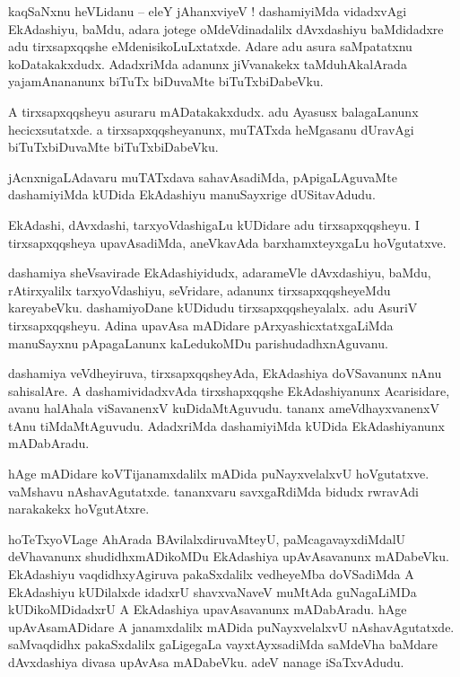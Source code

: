 \documentclass{article}
\begin{document}
\begin{mn}%
kaqSaNxnu heVLidanu -- eleY jAhanxviyeV ! dashamiyiMda vidadxvAgi EkAdashiyu, baMdu, adara jotege 
oMdeVdinadalilx dAvxdashiyu baMdidadxre adu tirxsapxqqshe eMdenisikoLuLxtatxde. Adare adu asura 
saMpatatxnu koDatakakxdudx. AdadxriMda adanunx jiVvanakekx taMduhAkalArada yajamAnananunx biTuTx 
biDuvaMte biTuTxbiDabeVku.
\end{mn}

\begin{mn}%
A tirxsapxqqsheyu asuraru mADatakakxdudx. adu Ayasusx balagaLanunx hecicxsutatxde. a 
tirxsapxqqsheyanunx, muTATxda heMgasanu dUravAgi biTuTxbiDuvaMte biTuTxbiDabeVku.
\end{mn}

\begin{mn}%
jAcnxnigaLAdavaru muTATxdava sahavAsadiMda, pApigaLAguvaMte dashamiyiMda kUDida EkAdashiyu 
manuSayxrige dUSitavAdudu.
\end{mn}

\begin{mn}%
EkAdashi, dAvxdashi, tarxyoVdashigaLu kUDidare adu tirxsapxqqsheyu. I tirxsapxqqsheya upavAsadiMda, 
aneVkavAda barxhamxteyxgaLu hoVgutatxve.
\end{mn}

\begin{mn}%
dashamiya sheVsavirade EkAdashiyidudx, adarameVle dAvxdashiyu, baMdu, rAtirxyalilx tarxyoVdashiyu, 
seVridare, adanunx tirxsapxqqsheyeMdu kareyabeVku. dashamiyoDane kUDidudu tirxsapxqqsheyalalx. adu 
AsuriV tirxsapxqqsheyu. Adina upavAsa mADidare pArxyashicxtatxgaLiMda manuSayxnu pApagaLanunx 
kaLedukoMDu parishudadhxnAguvanu.
\end{mn}

\begin{mn}%
dashamiya veVdheyiruva, tirxsapxqqsheyAda, EkAdashiya doVSavanunx nAnu sahisalAre. A 
dashamividadxvAda tirxshapxqqshe EkAdashiyanunx Acarisidare, avanu halAhala viSavanenxV 
kuDidaMtAguvudu. tananx ameVdhayxvanenxV tAnu tiMdaMtAguvudu. AdadxriMda dashamiyiMda kUDida 
EkAdashiyanunx mADabAradu.
\end{mn}

\begin{mn}%
hAge mADidare koVTijanamxdalilx mADida puNayxvelalxvU hoVgutatxve. vaMshavu nAshavAgutatxde. 
tananxvaru savxgaRdiMda bidudx rwravAdi narakakekx hoVgutAtxre.
\end{mn}

\begin{mn}%
hoTeTxyoVLage AhArada BAvilalxdiruvaMteyU, paMcagavayxdiMdalU deVhavanunx shudidhxmADikoMDu 
EkAdashiya upAvAsavanunx mADabeVku. EkAdashiyu vaqdidhxyAgiruva pakaSxdalilx vedheyeMba doVSadiMda 
A EkAdashiyu kUDilalxde idadxrU shavxvaNaveV muMtAda guNagaLiMDa kUDikoMDidadxrU A EkAdashiya 
upavAsavanunx mADabAradu. hAge upAvAsamADidare A janamxdalilx mADida puNayxvelalxvU 
nAshavAgutatxde. saMvaqdidhx pakaSxdalilx gaLigegaLa vayxtAyxsadiMda saMdeVha baMdare dAvxdashiya 
divasa upAvAsa mADabeVku. adeV nanage iSaTxvAdudu.
\end{mn}
\end{document}
